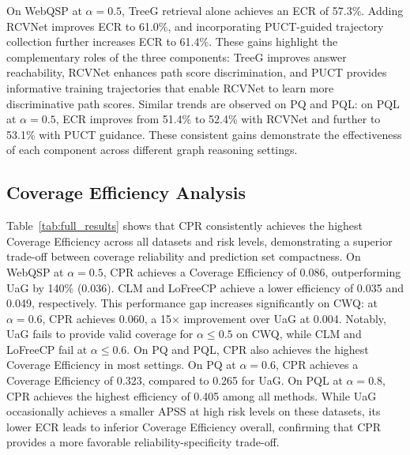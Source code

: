 \documentclass{article}
\newcommand{\jy}[1]{\textcolor{red}{[JY: #1]}}
\theoremstyle{plain}
\theoremstyle{definition}
\theoremstyle{remark}
\begin{document}
 
On WebQSP at $\alpha=0.5$, TreeG retrieval alone achieves an ECR of 57.3\%. Adding RCVNet improves ECR to 61.0\%, and incorporating PUCT-guided trajectory collection further increases ECR to 61.4\%. These gains highlight the complementary roles of the three components: TreeG improves answer reachability, RCVNet enhances path score discrimination, and PUCT provides informative training trajectories that enable RCVNet to learn more discriminative path scores. Similar trends are observed on PQ and PQL: on PQL at $\alpha=0.5$, %
ECR improves from 51.4\% to 52.4\% with RCVNet and further to 53.1\% with PUCT guidance. These consistent gains demonstrate the effectiveness of each component across different graph reasoning settings.



\subsection{Coverage Efficiency Analysis}
Table~\ref{tab:full_results} shows that CPR consistently achieves the highest Coverage Efficiency across all datasets and risk levels, demonstrating a superior trade-off between coverage reliability and prediction set compactness. On WebQSP at $\alpha=0.5$, CPR achieves a Coverage Efficiency of 0.086, outperforming UaG by 140\% (0.036). CLM and LoFreeCP achieve a lower efficiency of 0.035 and 0.049, respectively.
This performance gap increases significantly on CWQ: at $\alpha=0.6$, CPR achieves 0.060, a 15$\times$ improvement over UaG at 0.004.
Notably, UaG fails to provide valid coverage for $\alpha \leq 0.5$ on CWQ, while CLM and LoFreeCP fail at $\alpha \leq 0.6$. On PQ and PQL, CPR also achieves the highest Coverage Efficiency in most settings. On PQ at $\alpha=0.6$, CPR achieves a Coverage Efficiency of 0.323, compared to 0.265 for UaG. On PQL at $\alpha=0.8$, CPR achieves the highest efficiency of 0.405 among all methods. While UaG occasionally achieves a smaller APSS at high risk levels on these datasets, its lower ECR leads to inferior Coverage Efficiency overall, confirming that CPR provides a more favorable reliability-specificity trade-off.
 
\end{document}
